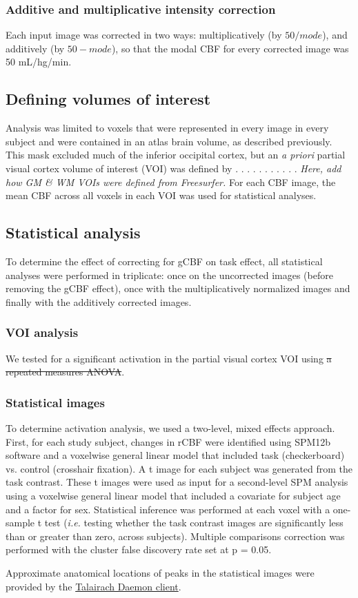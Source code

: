\subsubsection{Additive and multiplicative intensity correction}
Each input image was corrected in two ways: multiplicatively (by $50/mode$), and additively (by $50-mode$), so that the modal CBF for every corrected image was 50 mL/hg/min.

\subsection{Defining volumes of interest}
Analysis was limited to voxels that were represented in every image in every subject and were contained in an atlas brain volume, as described previously.\cite{Black_2010} This mask excluded much of the inferior occipital cortex, but an \textit{a priori} partial visual cortex volume of interest (VOI) was defined by . . . . . . . . . . .  \textit{Here, add how GM & WM VOIs were defined from Freesurfer.} For each CBF image, the mean CBF across all voxels in each VOI was used for statistical analyses.

\subsection{Statistical analysis}
To determine the effect of correcting for gCBF on task effect, all statistical analyses were performed in triplicate: once on the uncorrected images (before removing the gCBF effect), once with the multiplicatively normalized images and finally with the additively corrected images.

\subsubsection{VOI analysis}
We tested for a significant activation in the partial visual cortex VOI using \sout{a repeated measures ANOVA}.

\subsubsection{Statistical images}
To determine activation analysis, we used a two-level, mixed effects approach.  First, for each study subject, changes in rCBF were identified using SPM12b software and a voxelwise general linear model that included task (checkerboard) vs. control (crosshair fixation). A t image for each subject was generated from the task contrast. These t images were used as input for a second-level SPM analysis using a voxelwise general linear model that included a covariate for subject age and a factor for sex. Statistical inference was performed at each voxel with a one-sample t test (\textit{i.e.} testing whether the task contrast images are significantly less than or greater than zero, across subjects). Multiple comparisons correction was performed with the cluster false discovery rate set at p = 0.05. 

Approximate anatomical locations of peaks in the statistical images were provided by the \href{http://www.talairach.org}{Talairach Daemon client}.\cite{20408222}\cite{10912591}
